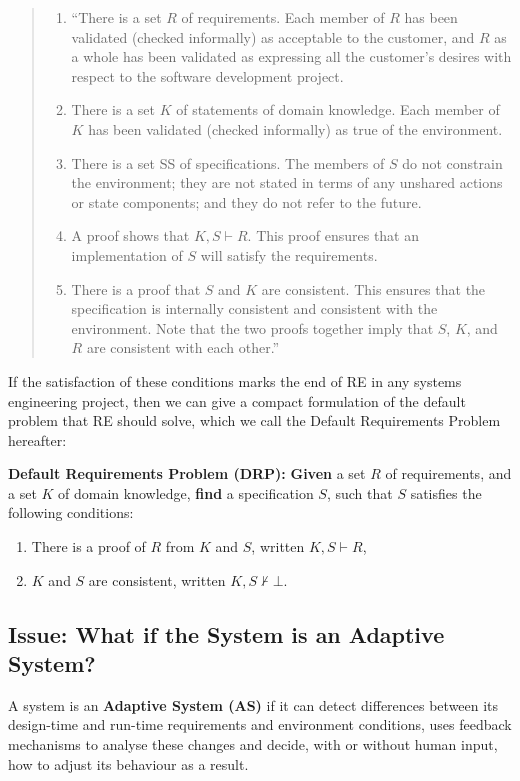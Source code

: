 \documentclass[graybox]{svmult}
\newcommand{\xb}[1]{\textbf{#1}}
\newcommand{\RE}{RE}
\newcommand{\RPfull}{Requirements Problem}
\newcommand{\ASfull}{Adaptive System}
\newcommand{\AS}{AS}
\newcommand{\ZJRPfull}{Default \RPfull}
\newcommand{\ZJRP}{DRP}
\begin{document}
\begin{quote}
\begin{enumerate}
    \item{``There is a set $R$ of requirements. Each member of $R$ has been validated (checked informally) as acceptable to the customer, and $R$ as a whole has been validated as expressing all the customer's desires with respect to the software development project.}
    \item{There is a set $K$ of statements of domain knowledge. Each member of $K$ has been validated (checked informally) as true of the environment.}
    \item{There is a set SS of specifications. The members of $S$ do not constrain the environment; they are not stated in terms of any unshared actions or state components; and they do not refer to the future.}
    \item{A proof shows that $K, S \vdash R$. This proof ensures that an implementation of $S$ will satisfy the requirements.}
    \item{There is a proof that $S$ and $K$ are consistent. This ensures that the specification is internally consistent and consistent with the environment. Note that the two proofs together imply that $S$, $K$, and $R$ are consistent with each other.''}
\end{enumerate}
\end{quote}

If the satisfaction of these conditions marks the end of \RE{} in any systems engineering project, then we can give a compact formulation of the default problem that \RE{} should solve, which we call the \ZJRPfull{} hereafter:

\begin{definition}\label{d:zjrp}
\xb{\ZJRPfull{} (\ZJRP):} \xb{Given} a set $R$ of requirements, and a set $K$ of domain knowledge, \xb{find} a specification $S$, such that $S$ satisfies the following conditions:
\begin{enumerate}
    \item{There is a proof of $R$ from $K$ and $S$, written $K, S \vdash R$,}
    \item{$K$ and $S$ are consistent, written $K, S \not\vdash \bot$.}
\end{enumerate}
\end{definition}


%
\subsection{Issue: What if the System is an \ASfull?}\label{s:introduction:issue}
A system is an \xb{\ASfull{} (\AS)} if it can detect differences between its design-time and run-time requirements and environment conditions, uses feedback mechanisms to analyse these changes and decide, with or without human input, how to adjust its behaviour as a result. 
\end{document}
